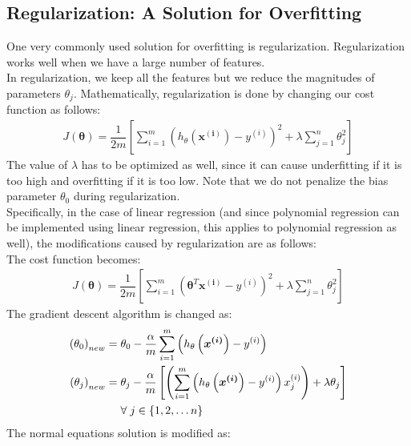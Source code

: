 \documentclass[a4paper, 12pt]{article}
\begin{document}
\subsection{Regularization: A Solution for Overfitting}
One very commonly used solution for overfitting is regularization. Regularization works well when we have a large number of features.\\
\break
In regularization, we keep all the features but we reduce the magnitudes of parameters $\theta_j$. Mathematically, regularization is done by changing our cost function as follows:
\begin{align*}
J\left(\bm{\theta}\right) = \dfrac{1}{2m}\left[\sum_{i=1}^{m}\left(h_{\theta}\left(\bm{x^{\left(i\right)}}\right)-y^{\left(i\right)}\right)^2 + \lambda\sum_{j=1}^{n}\theta_j^2\right]
\end{align*}
The value of $\lambda$ has to be optimized as well, since it can cause underfitting if it is too high and overfitting if it is too low. Note that we do not penalize the bias parameter $\theta_0$ during regularization.\\
\break
Specifically, in the case of linear regression (and since polynomial regression can be implemented using linear regression, this applies to polynomial regression as well), the modifications caused by regularization are as follows: \\
\break
The cost function becomes:
\begin{align*}
J\left(\bm{\theta}\right) = \dfrac{1}{2m}\left[\sum_{i=1}^{m}\left(\bm{\theta}^T\bm{x^{\left(i\right)}}-y^{\left(i\right)}\right)^2 + \lambda\sum_{j=1}^{n}\theta_j^2\right]
\end{align*}
The gradient descent algorithm is changed as:
\begin{align*}
\left(\theta_0\right)_{new} =& \hspace{1mm} \theta_0 - \dfrac{\alpha}{m}\sum_{i=1}^{m}\left(h_{\theta}\left(\bm{x^{\left(i\right)}}\right)-y^{\left(i\right)}\right) \\
\left(\theta_j\right)_{new} =& \hspace{1mm} \theta_j - \dfrac{\alpha}{m}\left[\left(\sum_{i=1}^{m}\left(h_{\theta}\left(\bm{x^{\left(i\right)}}\right)-y^{\left(i\right)}\right)x^{\left(i\right)}_j\right) + \lambda\theta_j\right] \\
& \hspace{1mm} \forall \hspace{1mm} j \in \{1, 2, \dots n\}
\end{align*}
The normal equations solution is modified as:
\end{document}
